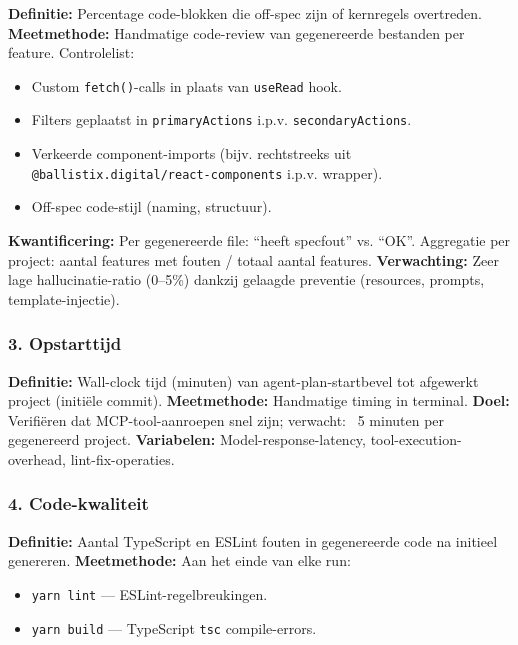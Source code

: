 \noindent
\textbf{Definitie:} Percentage code-blokken die off-spec zijn of kernregels overtreden. \newline
\textbf{Meetmethode:} Handmatige code-review van gegenereerde bestanden per feature. Controlelist:
\begin{itemize}
  \item Custom \texttt{fetch()}-calls in plaats van \texttt{useRead} hook.
  \item Filters geplaatst in \texttt{primaryActions} i.p.v. \texttt{secondaryActions}.
  \item Verkeerde component-imports (bijv. rechtstreeks uit \texttt{@ballistix.digital/react-components} i.p.v. wrapper).
  \item Off-spec code-stijl (naming, structuur).
\end{itemize}

\noindent
\textbf{Kwantificering:} Per gegenereerde file: ``heeft specfout'' vs. ``OK''. Aggregatie per project: aantal features met fouten / totaal aantal features. \newline
\textbf{Verwachting:} Zeer lage hallucinatie-ratio (0--5\%) dankzij gelaagde preventie (resources, prompts, template-injectie).

\subsubsection{3. Opstarttijd}

\noindent
\textbf{Definitie:} Wall-clock tijd (minuten) van agent-plan-startbevel tot afgewerkt project (initiële commit). \newline
\textbf{Meetmethode:} Handmatige timing in terminal. \newline
\textbf{Doel:} Verifiëren dat MCP-tool-aanroepen snel zijn; verwacht: ~5 minuten per gegenereerd project. \newline
\textbf{Variabelen:} Model-response-latency, tool-execution-overhead, lint-fix-operaties.

\subsubsection{4. Code-kwaliteit}

\noindent
\textbf{Definitie:} Aantal TypeScript en ESLint fouten in gegenereerde code na initieel genereren. \newline
\textbf{Meetmethode:} Aan het einde van elke run:
\begin{itemize}
  \item \texttt{yarn lint} — ESLint-regelbreukingen.
  \item \texttt{yarn build} — TypeScript \texttt{tsc} compile-errors.
\end{itemize}

